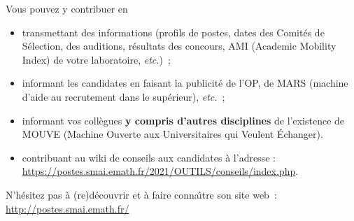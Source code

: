 Vous pouvez y contribuer en
\begin{itemize}
\item transmettant des
informations (profils de postes, dates des Comit\'es de S\'election, des auditions, r\'esultats des
concours, AMI (Academic Mobility Index) de votre laboratoire, {\em
etc.})~;
\item informant les candidat\mp e\mp s en faisant la publicit\'e de
l'OP, de MARS (machine d'aide au recrutement dans le sup\'erieur),
{\em etc.}~;
\item informant vos coll\`egues {\bf y compris d'autres
disciplines} de l'existence de MOUVE (Machine Ouverte aux
Universitaires qui Veulent
\'Echanger).
 
\item contribuant au wiki de conseils aux candidat\mp e\mp s \`a l'adresse : \url{https://postes.smai.emath.fr/2021/OUTILS/conseils/index.php}.
\end{itemize}

N'h\'esitez pas \`a (re)d\'ecouvrir
et \`a faire conna\^\i  tre son site web~:
\url{http://postes.smai.emath.fr/}